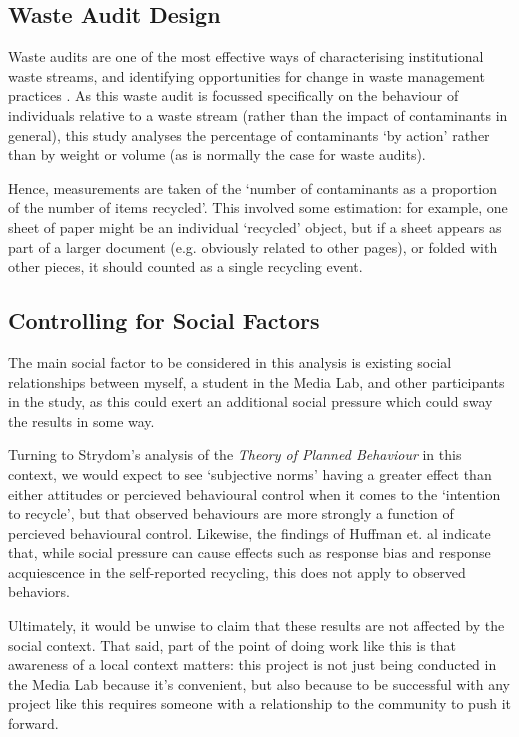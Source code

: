 \documentclass[nofonts,nols,justified,nobib]{tufte-book}
\begin{document}
\subsection*{Waste Audit Design}

Waste audits are one of the most effective ways of characterising institutional waste streams, and identifying opportunities for change in waste management practices \cite{smyth_reducing_2010}. As this waste audit is focussed specifically on the behaviour of individuals relative to a waste stream (rather than the impact of contaminants in general), this study analyses the percentage of contaminants `by action' rather than by weight or volume (as is normally the case for waste audits).

Hence, measurements are taken of the ‘number of contaminants as a proportion of the number of items recycled’. This involved some estimation: for example, one sheet of paper might be an individual ‘recycled’ object, but if a sheet appears as part of a larger document (e.g. obviously related to other pages), or folded with other pieces, it should counted as a single recycling event. 


\subsection*{Controlling for Social Factors}
The main social factor to be considered in this analysis is existing social relationships between myself, a student in the Media Lab, and other participants in the study, as this could exert an additional social pressure which could sway the results in some way.

Turning to Strydom's analysis of the \emph{Theory of Planned Behaviour} in this context, we would expect to see `subjective norms' having a greater effect than either attitudes or percieved behavioural control when it comes to the `intention to recycle', but that observed behaviours are more strongly a function of percieved behavioural control. Likewise, the findings of Huffman et. al indicate that, while social pressure can cause effects such as response bias and response acquiescence in the self-reported recycling, this does not apply to observed behaviors. 

Ultimately, it would be unwise to claim that these results are not affected by the social context. That said, part of the point of doing work like this is that awareness of a local context matters: this project is not just being conducted in the Media Lab because it’s convenient, but also because to be successful with any project like this requires someone with a relationship to the community to push it forward.
\end{document}
